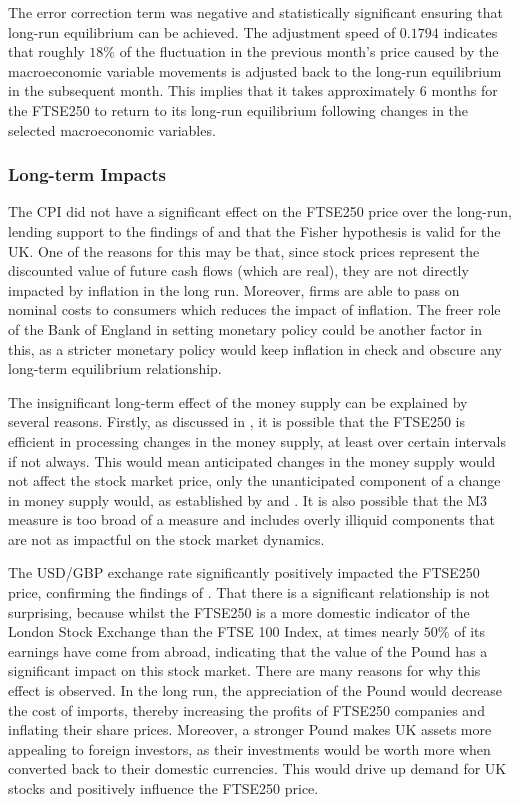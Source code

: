 \documentclass[11pt,a4paper]{article}
\newcommand{\citeboth}[1]{\citeauthor{#1} \citep{#1}}
\begin{document}
The error correction term 
was negative and statistically significant ensuring that long-run equilibrium 
can be achieved. The adjustment speed of $0.1794$ indicates that 
roughly $18\%$ of the fluctuation in the previous month's price caused by the 
macroeconomic variable movements is adjusted back to the long-run equilibrium in the subsequent month. This implies 
that it takes approximately 6 months for the FTSE250 to return to its long-run equilibrium following 
changes in the selected macroeconomic variables.

\subsubsection{Long-term Impacts}

The CPI did not have a significant effect on the FTSE250 price over the 
long-run, lending support to the findings of 
\citeboth{gultekin1983} and \citeboth{firth1979}
that the Fisher hypothesis is valid for the UK. One of the 
reasons for this may be that, since stock prices represent the 
discounted value of future cash flows (which are real), 
they are not directly impacted by inflation in the long run. Moreover, 
firms are able to pass on nominal costs to consumers which reduces
the impact of inflation.
The freer role of the Bank of England in setting monetary policy could be 
another factor in this, as a stricter monetary policy would keep inflation
in check and obscure any long-term equilibrium relationship. 

The insignificant long-term effect of the money supply can be explained by several reasons.
Firstly, as discussed in \citeboth{sellin2001}, it is possible that the FTSE250 is efficient in processing changes in the 
money supply, at least over certain intervals if not always. This would mean anticipated changes in the money supply would not affect the stock market price, only the
unanticipated component of a change in money supply would, as established by \citeboth{sorensen1982} and \citeboth{bernanke2005}. 
It is also possible that the M3 measure is too broad of a measure and includes overly illiquid components that are not as impactful 
on the stock market dynamics. 

The USD/GBP exchange rate significantly positively impacted the FTSE250 price, confirming the findings of 
\citeboth{wong2022}. That there is a 
significant relationship is not surprising, because whilst the FTSE250 is a more domestic indicator of the London Stock Exchange than the FTSE 100 Index, 
at times nearly $50\%$ of its earnings have come from abroad, indicating that 
the value of the Pound has a significant impact on this stock market. There are many reasons for why this effect is observed.
In the long run, the appreciation of the Pound would decrease the 
cost of imports, thereby increasing the 
profits of FTSE250 companies and inflating their share prices.
Moreover, a stronger Pound makes UK assets more appealing to foreign investors, as their investments would be worth more when converted back to their domestic currencies.
This would drive up demand for UK stocks and positively influence the 
FTSE250 price.
\end{document}
